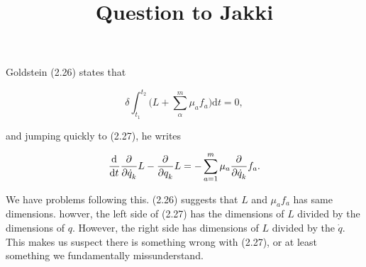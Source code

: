 \documentclass{article}
\title {Question to Jakki}
\begin{document}
    Goldstein (2.26) states that

    \begin{equation*}
        \delta \int_{t_1}^{t_2} \bigg(L + \sum_{\alpha}^m \mu_a f_a \bigg) \mathrm{d}t = 0,
    \end{equation*}
    
    and jumping quickly to (2.27), he writes

    \begin{equation*}
        \d[t] \del[\dot q_k] L - \del[q_k] L = - \sum_{a = 1}^m \mu_a \del[\dot q_k] f_a.
    \end{equation*}

    We have problems following this. (2.26) suggests that \(L\) and \(\mu_a f_a\) has same dimensions. howver, the left side of (2.27) has the dimensions of \(L\) divided by the dimensions of \(q\). However, the right side has dimensions of \(L\) divided by the \(\dot q\). This makes us suspect there is something wrong with (2.27), or at least something we fundamentally missunderstand.
\end{document}
